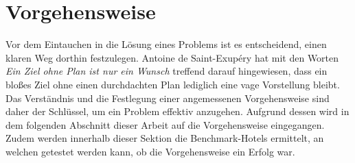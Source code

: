 \section{Vorgehensweise}
\label{sec:Vorgehensweise}
Vor dem Eintauchen in die Lösung eines Problems ist es entscheidend, einen klaren Weg dorthin festzulegen. Antoine de Saint-Exupéry hat mit den Worten \emph{Ein Ziel ohne Plan ist nur ein Wunsch} treffend darauf hingewiesen, dass ein bloßes Ziel ohne einen durchdachten Plan lediglich eine vage Vorstellung bleibt. Das Verständnis und die Festlegung einer angemessenen Vorgehensweise sind daher der Schlüssel, um ein Problem effektiv anzugehen. Aufgrund dessen wird in dem folgenden Abschnitt dieser Arbeit auf die Vorgehensweise eingegangen. Zudem werden innerhalb dieser Sektion die Benchmark-Hotels ermittelt, an welchen getestet werden kann, ob die Vorgehensweise ein Erfolg war.  


